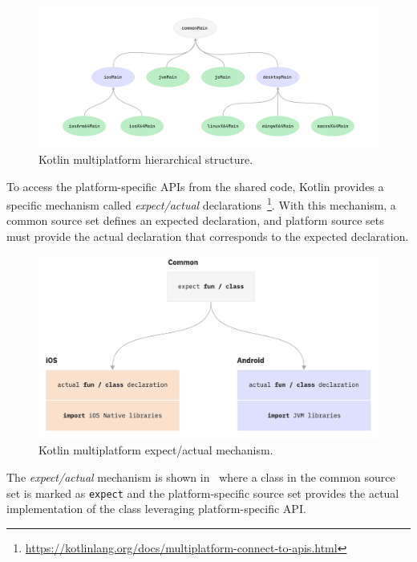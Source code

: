 

\begin{figure}[ht]
	\centering
	\includegraphics[width=\linewidth]{figures/kotlin-multiplatform-hierarchical-structure.pdf}
	\caption{Kotlin multiplatform hierarchical structure.}
	\label{fig:kotlin-multiplatform-hierarchy}
\end{figure}

To access the platform-specific APIs from the shared code, Kotlin provides a specific mechanism called \emph{expect/actual}
declarations~\footnote{\url{https://kotlinlang.org/docs/multiplatform-connect-to-apis.html}}.
With this mechanism, a common source set defines an expected declaration, and platform source sets must provide the actual declaration that
corresponds to the expected declaration.

\begin{figure}
	\centering
	\includegraphics[width=\linewidth]{figures/expect-actual.png}
	\caption{Kotlin multiplatform expect/actual mechanism.}
	\label{fig:kotlin-multiplatform-expected-actual}
\end{figure}

The \emph{expect/actual} mechanism is shown in~ where a class in the common source set is marked as
\texttt{expect} and the platform-specific source set provides the actual implementation of the class leveraging platform-specific API.

